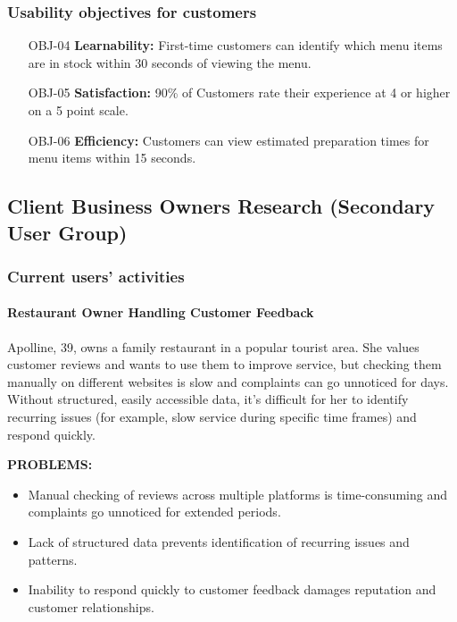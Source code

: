 \documentclass[]{VUMIFTemplateClass}
\newcommand{\suggestioncomment}[1]{%
    \definecolor{lime}{RGB}{50,205,50}%
    \begin{tcolorbox}[colback=lime!15, colframe=lime!60, arc=0pt, outer arc=0pt, boxrule=1pt, left=3pt, right=3pt, top=3pt, bottom=3pt]
        \textbf{\textcolor{lime!70!black}{SUGGESTION:}} #1
    \end{tcolorbox}%
}
\newcommand{\subsubsubsection}[1]{\paragraph{#1}}
\begin{document}
\subsubsection{Usability objectives for customers}
\begin{itemize}
    \item[OBJ-04]\label{OBJ-04} \textbf{Learnability:} First-time customers can identify which menu items are in stock within 30 seconds of viewing the menu.
    \item[OBJ-05]\label{OBJ-05} \textbf{Satisfaction:} 90\% of Customers rate  their experience at 4 or higher on a 5 point scale.
     \item[OBJ-06]\label{OBJ-06} \textbf{Efficiency:} Customers can view estimated preparation times for menu items within 15 seconds.
\end{itemize}

\subsection{Client Business Owners Research (Secondary User Group)}

\subsubsection{Current users' activities}

\subsubsubsection{Restaurant Owner Handling Customer Feedback}
\label{subsubsubsec:owner-feedback}

Apolline, 39, owns a family restaurant in a popular tourist area. She values
customer reviews and wants to use them to improve service, but checking them
manually on different websites is slow and complaints can go unnoticed for days. Without structured, easily accessible data, it’s difficult for her to identify recurring issues (for example, slow service during specific time frames) and respond quickly.

\textbf{PROBLEMS:}
\begin{itemize}
    \item Manual checking of reviews across multiple platforms is time-consuming and complaints go unnoticed for extended periods.
    \item Lack of structured data prevents identification of recurring issues and patterns.
    \item Inability to respond quickly to customer feedback damages reputation and customer relationships.
\end{itemize}
\end{document}

